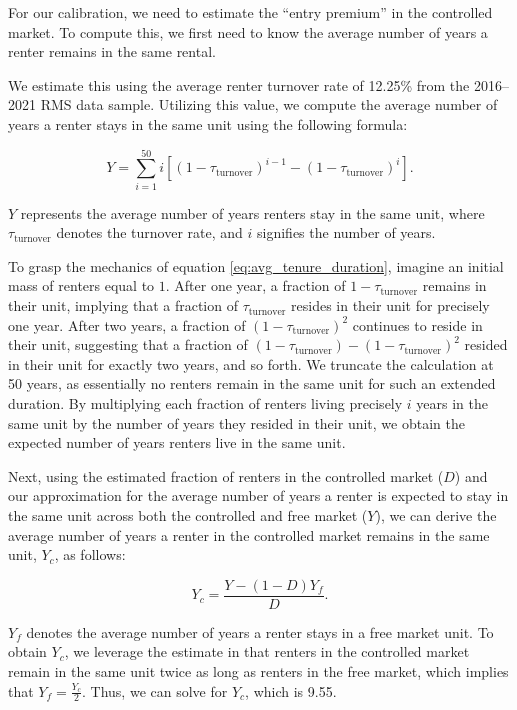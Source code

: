 For our calibration, we need to estimate the ``entry premium'' in the controlled market. To compute this, we first need to know the average number of years a renter remains in the same rental. 

We estimate this using the average renter turnover rate of 12.25\% from the 2016--2021 RMS data sample. Utilizing this value, we compute the average number of years a renter stays in the same unit using the following formula:

\begin{equation}\label{eq:avg_tenure_duration}
    Y=\sum_{i=1}^{50}i\left[(1-\tau_{\text{turnover}})^{i-1}-(1-\tau_{\text{turnover}})^{i}\right].
\end{equation}

\noindent $Y$ represents the average number of years renters stay in the same unit, where $\tau_{\text{turnover}}$ denotes the turnover rate, and $i$ signifies the number of years.

To grasp the mechanics of equation \eqref{eq:avg_tenure_duration}, imagine an initial mass of renters equal to $1$. After one year, a fraction of $1-\tau_{\text{turnover}}$ remains in their unit, implying that a fraction of $\tau_{\text{turnover}}$ resides in their unit for precisely one year. After two years, a fraction of $(1-\tau_{\text{turnover}})^2$ continues to reside in their unit, suggesting that a fraction of $(1-\tau_{\text{turnover}})-(1-\tau_{\text{turnover}})^2$ resided in their unit for exactly two years, and so forth. We truncate the calculation at 50 years, as essentially no renters remain in the same unit for such an extended duration. By multiplying each fraction of renters living precisely $i$ years in the same unit by the number of years they resided in their unit, we obtain the expected number of years renters live in the same unit.

Next, using the estimated fraction of renters in the controlled market ($D$) and our approximation for the average number of years a renter is expected to stay in the same unit across both the controlled and free market ($Y$), we can derive the average number of years a renter in the controlled market remains in the same unit, $Y_{c}$, as follows:

\begin{equation*}
    Y_{c}=\frac{Y-(1-D)Y_{f}}{D}.
\end{equation*}

\noindent $Y_{f}$ denotes the average number of years a renter stays in a free market unit. To obtain $Y_{c}$, we leverage the estimate in \citet{cjq-2023} that renters in the controlled market remain in the same unit twice as long as renters in the free market, which implies that $Y_{f}=\frac{Y_{c}}{2}$. Thus, we can solve for $Y_{c}$, which is 9.55.

